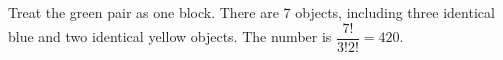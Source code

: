 Treat the green pair as one block. There are 7 objects, including three identical blue and two identical yellow objects. The number is $\dfrac{7!}{3!2!}=\boxed{420}$.

